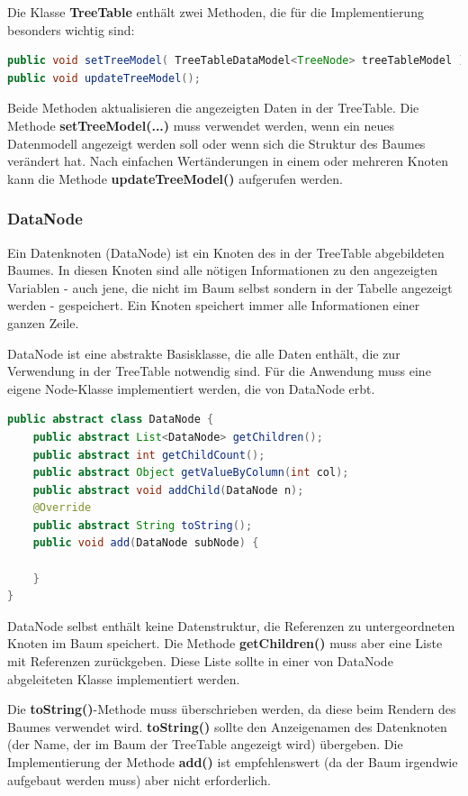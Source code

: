 Die Klasse \textbf{TreeTable} enthält zwei Methoden, die für die Implementierung besonders wichtig sind:
\begin{lstlisting}[language=JAVA]
public void setTreeModel( TreeTableDataModel<TreeNode> treeTableModel );
public void updateTreeModel();
\end{lstlisting}

Beide Methoden aktualisieren die angezeigten Daten in der TreeTable. Die Methode \textbf{setTreeModel(...)} muss verwendet werden, wenn ein neues Datenmodell angezeigt werden soll oder wenn sich die Struktur des Baumes verändert hat. Nach einfachen Wertänderungen in einem oder mehreren Knoten kann die Methode \textbf{updateTreeModel()} aufgerufen werden.

\subsubsection*{DataNode}
Ein Datenknoten (DataNode) ist ein Knoten des in der TreeTable abgebildeten Baumes. In diesen Knoten sind alle nötigen Informationen zu den angezeigten Variablen - auch jene, die nicht im Baum selbst sondern in der Tabelle angezeigt werden - gespeichert. Ein Knoten speichert immer alle Informationen einer ganzen Zeile.

DataNode ist eine abstrakte Basisklasse, die alle Daten enthält, die zur Verwendung in der TreeTable notwendig sind. Für die Anwendung muss eine eigene Node-Klasse implementiert werden, die von DataNode erbt.

\begin{lstlisting}[language=JAVA]
public abstract class DataNode {
	public abstract List<DataNode> getChildren();
	public abstract int getChildCount();
	public abstract Object getValueByColumn(int col);
	public abstract void addChild(DataNode n);
	@Override
	public abstract String toString();
	public void add(DataNode subNode) {
	
	}
}
\end{lstlisting}

DataNode selbst enthält keine Datenstruktur, die Referenzen zu untergeordneten Knoten im Baum speichert. Die Methode \textbf{getChildren()} muss aber eine Liste mit Referenzen zurückgeben. Diese Liste sollte in einer von DataNode abgeleiteten Klasse implementiert werden.

Die \textbf{toString()}-Methode muss überschrieben werden, da diese beim Rendern des Baumes verwendet wird. \textbf{toString()} sollte den Anzeigenamen des Datenknoten (der Name, der im Baum der TreeTable angezeigt wird) übergeben. Die Implementierung der Methode \textbf{add()} ist empfehlenswert (da der Baum irgendwie aufgebaut werden muss) aber nicht erforderlich.

